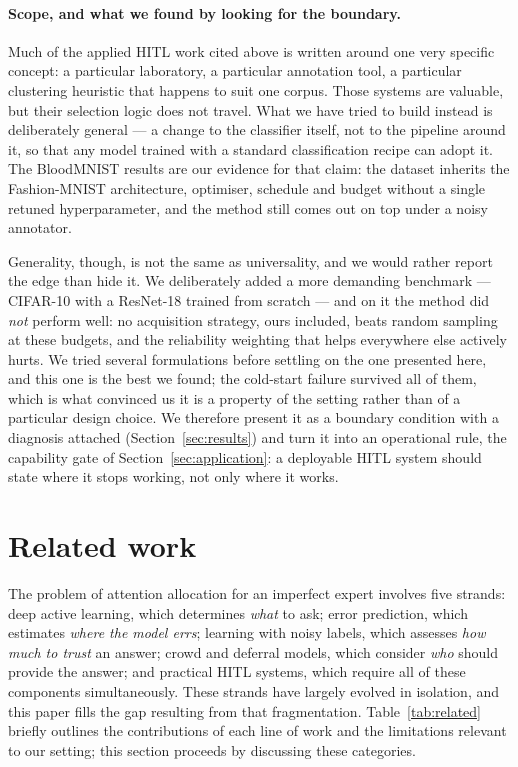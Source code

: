 \documentclass[a4paper,fleqn,longmktitle]{cas-sc}
\begin{document}
\paragraph{Scope, and what we found by looking for the boundary.} Much
of the applied HITL work cited above is written around one very
specific concept: a particular laboratory, a particular annotation
tool, a particular clustering heuristic that happens to suit one
corpus. Those systems are valuable, but their selection logic does not
travel. What we have tried to build instead is deliberately general ---
a change to the classifier itself, not to the pipeline around it, so
that any model trained with a standard classification recipe can adopt
it. The BloodMNIST results are our evidence for that claim: the
dataset inherits the Fashion-MNIST architecture, optimiser, schedule
and budget without a single retuned hyperparameter, and the method
still comes out on top under a noisy annotator.

Generality, though, is not the same as universality, and we would
rather report the edge than hide it. We deliberately added a more
demanding benchmark --- CIFAR-10 with a ResNet-18 trained from scratch
--- and on it the method did \emph{not} perform well: no acquisition
strategy, ours included, beats random sampling at these budgets, and
the reliability weighting that helps everywhere else actively hurts.
We tried several formulations before settling on the one presented
here, and this one is the best we found; the cold-start failure
survived all of them, which is what convinced us it is a property of
the setting rather than of a particular design choice. We therefore
present it as a boundary condition with a diagnosis attached
(Section~\ref{sec:results}) and turn it into an operational rule, the
capability gate of Section~\ref{sec:application}: a deployable HITL
system should state where it stops working, not only where it works.

\section{Related work}\label{sec:related}
The problem of attention allocation for an imperfect expert involves
five strands: deep active learning, which determines \emph{what} to
ask; error prediction, which estimates \emph{where the model errs};
learning with noisy labels, which assesses \emph{how much to trust} an
answer; crowd and deferral models, which consider \emph{who} should
provide the answer; and practical HITL systems, which require all of
these components simultaneously. These strands have largely evolved in
isolation, and this paper fills the gap resulting from that
fragmentation. Table~\ref{tab:related} briefly outlines the
contributions of each line of work and the limitations relevant to our
setting; this section proceeds by discussing these categories.
\end{document}
